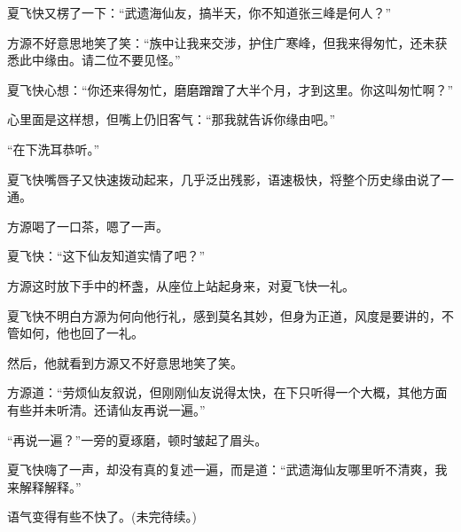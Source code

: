 \begin{this_body}
夏飞快又楞了一下：“武遗海仙友，搞半天，你不知道张三峰是何人？”

方源不好意思地笑了笑：“族中让我来交涉，护住广寒峰，但我来得匆忙，还未获悉此中缘由。请二位不要见怪。”

夏飞快心想：“你还来得匆忙，磨磨蹭蹭了大半个月，才到这里。你这叫匆忙啊？”

心里面是这样想，但嘴上仍旧客气：“那我就告诉你缘由吧。”

“在下洗耳恭听。”

夏飞快嘴唇子又快速拨动起来，几乎泛出残影，语速极快，将整个历史缘由说了一通。

方源喝了一口茶，嗯了一声。

夏飞快：“这下仙友知道实情了吧？”

方源这时放下手中的杯盏，从座位上站起身来，对夏飞快一礼。

夏飞快不明白方源为何向他行礼，感到莫名其妙，但身为正道，风度是要讲的，不管如何，他也回了一礼。

然后，他就看到方源又不好意思地笑了笑。

方源道：“劳烦仙友叙说，但刚刚仙友说得太快，在下只听得一个大概，其他方面有些并未听清。还请仙友再说一遍。”

“再说一遍？”一旁的夏琢磨，顿时皱起了眉头。

夏飞快嗨了一声，却没有真的复述一遍，而是道：“武遗海仙友哪里听不清爽，我来解释解释。”

语气变得有些不快了。(未完待续。)

\end{this_body}

